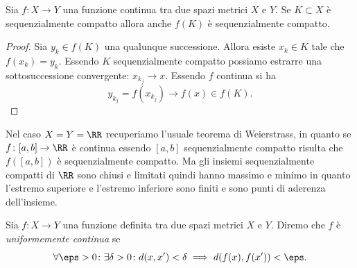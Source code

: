 \begin{theorem}
  \label{th:weiestrass_metrico}%
Sia $f\colon X \to Y$ una funzione continua tra
due spazi metrici $X$ e $Y$.
Se $K\subset X$ è sequenzialmente compatto allora
anche $f(K)$ è sequenzialmente compatto.
\end{theorem}
%
\begin{proof}
Sia $y_k \in f(K)$ una qualunque successione. Allora
esiste $x_k \in K$ tale che $f(x_k) = y_k$.
Essendo $K$ sequenzialmente compatto possiamo estrarre una sottosuccessione convergente: $x_{k_j}\to x$. 
Essendo $f$ continua si ha
\[
  y_{k_j} = f(x_{k_j}) \to f(x) \in f(K).
\]
\end{proof}

Nel caso $X=Y=\RR$ recuperiamo l'usuale teorema di Weierstrass, 
in quanto se $f\colon [a,b]\to \RR$ è continua essendo $[a,b]$ sequenzialmente compatto 
risulta che $f([a,b])$ è sequenzialmente compatto. 
Ma gli insiemi sequenzialmente compatti di $\RR$ sono chiusi e limitati 
quindi hanno 
massimo e minimo in quanto l'estremo superiore e l'estremo inferiore 
sono finiti e sono punti di aderenza dell'insieme.

\begin{definition}
  Sia $f\colon X \to Y$ una funzione definita tra due spazi metrici $X$ e $Y$.
  Diremo che $f$ è \emph{uniformemente continua}%
 se 
  \[
  \forall \eps>0 \colon \exists \delta>0 \colon 
    d(x,x')< \delta \implies d(f(x),f(x'))<\eps. 
  \]
\end{definition}

